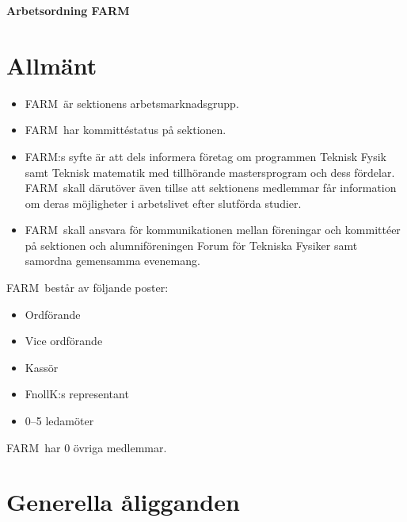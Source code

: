 

\renewcommand{\dateseparator}{-} %

\renewcommand{\forening}{FARM}

\begin{center}
\LARGE{\textbf{Arbetsordning \forening}}
\end{center}





\section{Allmänt}
\begin{itemize}
\item \forening \ är sektionens arbetsmarknadsgrupp. 
\item \forening \ har kommittéstatus på sektionen.
\item \forening:s syfte är att dels informera företag om programmen Teknisk Fysik samt Teknisk matematik med tillhörande mastersprogram och dess fördelar. \forening \ skall därutöver även tillse att sektionens medlemmar får information om deras möjligheter i arbetslivet efter slutförda studier.\
\item \forening \ skall ansvara för kommunikationen mellan föreningar och kommittéer på sektionen och alumniföreningen Forum för Tekniska Fysiker samt samordna gemensamma evenemang.\\
\end{itemize}

\forening \ består av följande poster:
\begin{itemize}
\item Ordförande
\item Vice ordförande
\item Kassör
\item FnollK:s representant
\item 0--5 ledamöter
\end{itemize}

\forening \ har 0 övriga medlemmar. 

\section{Generella åligganden}

